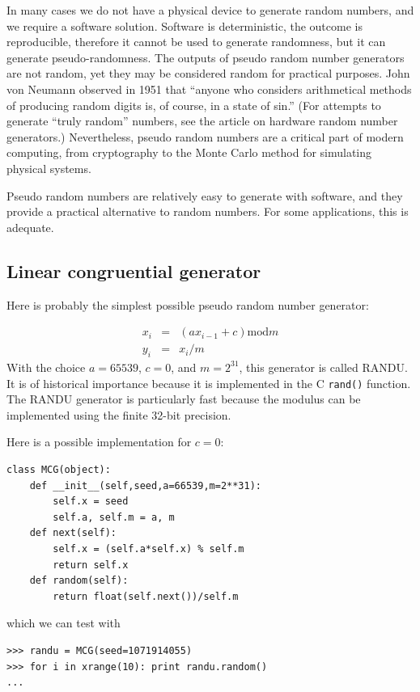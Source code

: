 \documentclass[justified,sixbynine]{tufte-book}
\def\ft{\small\tt}
\theoremstyle{plain}%
\theoremstyle{definition}
\theoremstyle{remark}
\begin{document}
\begin{fullwidth}
In many cases we do not have a physical device to generate random numbers,
and we require a software solution. Software is deterministic, the outcome
is reproducible, therefore it cannot be used to generate randomness, but it
can generate pseudo-randomness. The outputs of pseudo random number
generators are not random, yet they may be considered random for practical purposes.
John von Neumann observed in 1951 that ``anyone who
considers arithmetical methods of producing random digits is, of course, in
a state of sin.'' (For attempts to generate ``truly random'' numbers, see
the article on hardware random number generators.) Nevertheless,
pseudo random numbers are a critical part of modern computing, from
cryptography to the Monte Carlo method for simulating physical systems.

Pseudo random numbers are relatively easy to generate with software, and they
provide a practical alternative to random numbers. For some applications,
this is adequate.



\goodbreak\subsection{Linear congruential generator}

Here is probably the simplest possible pseudo random number generator:

\begin{eqnarray}
x_i &=&(a x_{i-1} + c) \textrm{mod}m \\
y_i &=&x_i/m
\end{eqnarray}
With the choice $a=65539$, $c=0$, and $m=2^{31}$, this generator is called RANDU. It is of historical importance
because it is implemented in the C {\ft rand()} function.
The RANDU generator is particularly fast because the modulus can
be implemented using the finite 32-bit precision.

Here is a possible implementation for $c=0$:
\begin{lstlisting}[caption={in file: {\ft nlib.py}}]
class MCG(object):
    def __init__(self,seed,a=66539,m=2**31):
        self.x = seed
        self.a, self.m = a, m
    def next(self):
        self.x = (self.a*self.x) % self.m
        return self.x
    def random(self):
        return float(self.next())/self.m
\end{lstlisting}

which we can test with
\begin{lstlisting}
>>> randu = MCG(seed=1071914055)
>>> for i in xrange(10): print randu.random()
...
\end{lstlisting}


\end{fullwidth}
\end{document}
